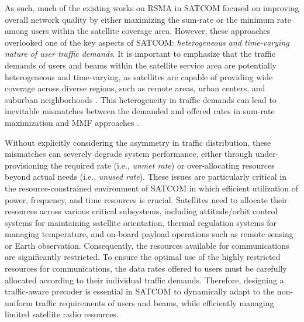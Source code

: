 \documentclass[draftclsnofoot, onecolumn, comsoc, 12pt]{IEEEtran}
\begin{document}
{ 
As such, much of the existing works on RSMA in SATCOM \cite{yin2020rate, yin2020rate_J, yin2021ratephy, si2022rate, liu2023energy, khan2023rate, xu2023distributed, lin2021supporting, lin2020secure, yin2022rate, 10266774, kim2023distributed} focused on improving overall network quality by either maximizing the sum-rate or the minimum rate among users within the satellite coverage area. However, these approaches overlooked one of the key aspects of SATCOM: \textit{heterogeneous and time-varying nature of user traffic demands}.
It is important to emphasize that the traffic demands of users and beams within the satellite service area are potentially heterogeneous and time-varying, as satellites are capable of providing wide coverage across diverse regions, such as remote areas, urban centers, and suburban neighborhoods \cite{alberti2010system}. %
This heterogeneity in traffic demands can lead to inevitable mismatches between the demanded and offered rates in sum-rate maximization and MMF approaches \cite{yin2020rate, yin2020rate_J, yin2021ratephy, si2022rate, liu2023energy, khan2023rate, xu2023distributed, lin2021supporting, lin2020secure, yin2022rate, 10266774, kim2023distributed}. 

Without explicitly considering the asymmetry in traffic distribution, these mismatches can severely degrade system performance, either through under-provisioning the required rate (i.e., \textit{unmet rate}) or over-allocating resources beyond actual needs (i.e., \textit{unused rate}). These issues are particularly critical in the resource-constrained environment of SATCOM in which efficient utilization of power, frequency, and time resources is crucial. Satellites need to allocate their resources across various critical subsystems, including attitude/orbit control systems for maintaining satellite orientation, thermal regulation systems for managing temperature, and on-board payload operations such as remote sensing or Earth observation. Consequently, the resources available for communications are significantly restricted. To ensure the optimal use of the highly restricted resources for communications, the data rates offered to users must be carefully allocated according to their individual traffic demands. Therefore, designing a traffic-aware precoder is essential in SATCOM to dynamically adapt to the non-uniform traffic requirements of users and beams, while efficiently managing limited satellite radio resources.}
\end{document}
